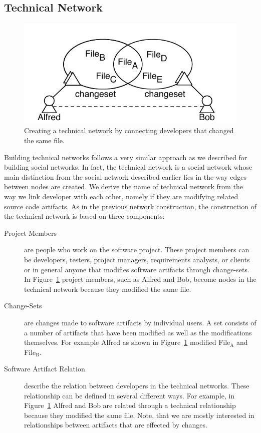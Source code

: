 \subsection{Technical Network}
\begin{figure}[t!]
\centering
\includegraphics[width=.7\textwidth]{figures/cochangedfiles}
\caption{Creating a technical network by connecting developers that changed the same file.}
\label{fig:addtechnicaledge}
\end{figure}

Building technical networks follows a very similar approach as we described for building social networks.
In fact, the technical network is a social network whose main distinction from the social network described earlier lies in the way edges between nodes are created.
We derive the name of technical network from the way we link developer with each other, namely if they are modifying related source code artifacts.
As in the previous network construction, the construction of the technical network is based on three components:

\begin{description}
\item[Project Members] are people who work on the software project. 
These project members can be developers, testers, project managers, requirements analysts,
or clients or in general anyone that modifies software artifacts through change-sets. 
In Figure~\ref{fig:addtechnicaledge} project members, such as Alfred and Bob, become nodes in the technical network because they modified the same file.

\item[Change-Sets] are changes made to software artifacts by individual users. 
A set consists of a number of artifacts that have been modified as well as the modifications themselves.
For example Alfred as shown in Figure~\ref{fig:addtechnicaledge} modified File$_{\text{A}}$ and File$_{\text{B}}$.

\item[Software Artifact Relation] describe the relation between developers in the technical networks.
These relationship can be defined in several different ways.
For example, in Figure~\ref{fig:addtechnicaledge} Alfred and Bob are related through a technical relationship because they modified the same file.
Note, that we are mostly interested in relationships between artifacts that are effected by changes.
\end{description}

